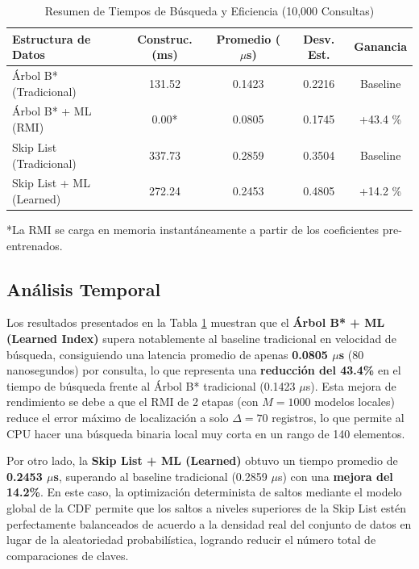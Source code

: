 \documentclass[twocolumn,10pt,journal]{IEEEtran}
\begin{document}
\begin{table}[h]
\centering
\caption{Resumen de Tiempos de B\'usqueda y Eficiencia (10,000 Consultas)}
\label{tab:resultados}
\begin{tabular}{lcccc}
\toprule
\textbf{Estructura de Datos} & \textbf{Construc. (ms)} & \textbf{Promedio ($\mu$s)} & \textbf{Desv. Est.} & \textbf{Ganancia} \\
\midrule
\'Arbol B* (Tradicional) & 131.52 & 0.1423 & 0.2216 & Baseline \\
\'Arbol B* + ML (RMI) & 0.00* & 0.0805 & 0.1745 & +43.4 \% \\
Skip List (Tradicional) & 337.73 & 0.2859 & 0.3504 & Baseline \\
Skip List + ML (Learned) & 272.24 & 0.2453 & 0.4805 & +14.2 \% \\
\bottomrule
\end{tabular}
\newline
\small{*La RMI se carga en memoria instantáneamente a partir de los coeficientes pre-entrenados.}
\end{table}

\subsection{An\'alisis Temporal}
Los resultados presentados en la Tabla \ref{tab:resultados} muestran que el \textbf{\'Arbol B* + ML (Learned Index)} supera notablemente al baseline tradicional en velocidad de b\'usqueda, consiguiendo una latencia promedio de apenas \textbf{0.0805 $\mu$s} (80 nanosegundos) por consulta, lo que representa una \textbf{reducci\'on del 43.4\%} en el tiempo de b\'usqueda frente al \'Arbol B* tradicional (0.1423 $\mu$s). Esta mejora de rendimiento se debe a que el RMI de 2 etapas (con $M = 1000$ modelos locales) reduce el error m\'aximo de localizaci\'on a solo $\Delta = 70$ registros, lo que permite al CPU hacer una b\'usqueda binaria local muy corta en un rango de 140 elementos.

Por otro lado, la \textbf{Skip List + ML (Learned)} obtuvo un tiempo promedio de \textbf{0.2453 $\mu$s}, superando al baseline tradicional (0.2859 $\mu$s) con una \textbf{mejora del 14.2\%}. En este caso, la optimizaci\'on determinista de saltos mediante el modelo global de la CDF permite que los saltos a niveles superiores de la Skip List est\'en perfectamente balanceados de acuerdo a la densidad real del conjunto de datos en lugar de la aleatoriedad probabil\'istica, logrando reducir el n\'umero total de comparaciones de claves.
\end{document}
